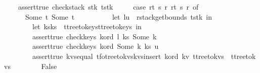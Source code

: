 \begin{isabellebody}
\ \ \ \ assert{\isacharunderscore}true\ {\isacharparenleft}check{\isacharunderscore}stack\ stk\ t{\isacharunderscore}stk{\isacharparenright}\ {\isacharampersand}\isanewline
\ \ \ \ {\isacharparenleft}case\ {\isacharparenleft}r{}t\ s\ r{}{\isacharcomma}\ r{}t\ s\ r{}{\isacharparenright}\ of\isanewline
\ \ \ \ \ \ {\isacharparenleft}Some\ t{}{\isacharcomma}\ Some\ t{}{\isacharparenright}\ {\isasymRightarrow}\ {\isacharparenleft}\isanewline
\ \ \ \ \ \ \ \ let\ {\isacharparenleft}l{\isacharcomma}u{\isacharparenright}\ {\isacharequal}\ rstack{\isacharunderscore}get{\isacharunderscore}bounds\ t{\isacharunderscore}stk\ in\isanewline
\ \ \ \ \ \ \ \ let\ {\isacharparenleft}ks{}{\isacharcomma}ks{}{\isacharparenright}\ {\isacharequal}\ {\isacharparenleft}t{}{\isacharbar}{\isachargreater}tree{\isacharunderscore}to{\isacharunderscore}keys{\isacharcomma}t{}{\isacharbar}{\isachargreater}tree{\isacharunderscore}to{\isacharunderscore}keys{\isacharparenright}\ in\isanewline
\ \ \ \ \ \ \ \ assert{\isacharunderscore}true\ {\isacharparenleft}check{\isacharunderscore}keys\ k{\isacharunderscore}ord\ l\ ks{}\ {\isacharparenleft}Some\ k{\isacharprime}{\isacharparenright}{\isacharparenright}\ {\isacharampersand}\isanewline
\ \ \ \ \ \ \ \ assert{\isacharunderscore}true\ {\isacharparenleft}check{\isacharunderscore}keys\ k{\isacharunderscore}ord\ {\isacharparenleft}Some\ k{\isacharprime}{\isacharparenright}\ ks{}\ u{\isacharparenright}\ {\isacharampersand}\isanewline
\ \ \ \ \ \ \ \ assert{\isacharunderscore}true\ {\isacharparenleft}kvs{\isacharunderscore}equal\ {\isacharparenleft}t{\isacharunderscore}fo{\isacharbar}{\isachargreater}tree{\isacharunderscore}to{\isacharunderscore}kvs{\isacharbar}{\isachargreater}kvs{\isacharunderscore}insert\ k{\isacharunderscore}ord\ {\isacharparenleft}k{\isacharcomma}v{\isacharparenright}{\isacharparenright}\ {\isacharparenleft}t{}{\isacharbar}{\isachargreater}tree{\isacharunderscore}to{\isacharunderscore}kvs\ {\isacharat}\ {\isacharparenleft}t{}{\isacharbar}{\isachargreater}tree{\isacharunderscore}to{\isacharunderscore}kvs{\isacharparenright}{\isacharparenright}{\isacharparenright}{\isacharparenright}\isanewline
\ \ \ \ \ \ {\isacharbar}{\isacharparenleft}{\isacharunderscore}{\isacharcomma}{\isacharunderscore}{\isacharparenright}\ {\isasymRightarrow}\ False\ {\isacharparenright}{\isacharparenright}{\isacharparenright}{\isachardoublequoteclose}\isanewline
\isanewline
\isanewline
{}\isamarkupfalse%

\end{isabellebody}
